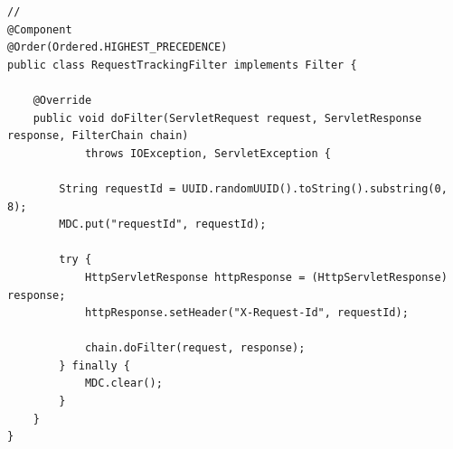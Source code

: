 \begin{lstlisting}[style=java]
// 
@Component
@Order(Ordered.HIGHEST_PRECEDENCE)
public class RequestTrackingFilter implements Filter {
    
    @Override
    public void doFilter(ServletRequest request, ServletResponse response, FilterChain chain) 
            throws IOException, ServletException {
        
        String requestId = UUID.randomUUID().toString().substring(0, 8);
        MDC.put("requestId", requestId);
        
        try {
            HttpServletResponse httpResponse = (HttpServletResponse) response;
            httpResponse.setHeader("X-Request-Id", requestId);
            
            chain.doFilter(request, response);
        } finally {
            MDC.clear();
        }
    }
}
\end{lstlisting}

\hypertarget{section-81}{%
\subsubsection{}\label{section-81}}

